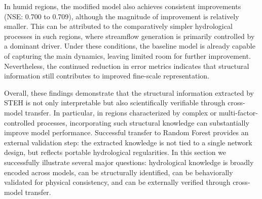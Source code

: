 In humid regions, the modified model also achieves consistent improvements (NSE: 0.700 to 0.709), although the magnitude of improvement is relatively smaller. This can be attributed to the comparatively simpler hydrological processes in such regions\cite{hess-25-2997-2021}, where streamflow generation is primarily controlled by a dominant driver. Under these conditions, the baseline model is already capable of capturing the main dynamics, leaving limited room for further improvement. Nevertheless, the continued reduction in error metrics indicates that structural information still contributes to improved fine-scale representation\cite{ABBASI2021125717}.

Overall, these findings demonstrate that the structural information extracted by STEH is not only interpretable but also scientifically verifiable through cross-model transfer. In particular, in regions characterized by complex or multi-factor-controlled processes, incorporating such structural knowledge can substantially improve model performance. Successful transfer to Random Forest provides an external validation step: the extracted knowledge is not tied to a single network design, but reflects portable hydrological regularities. In this section we successfully illustrate several major questions: hydrological knowledge is broadly encoded across models, can be structurally identified, can be behaviorally validated for physical consistency, and can be externally verified through cross-model transfer.

\FloatBarrier